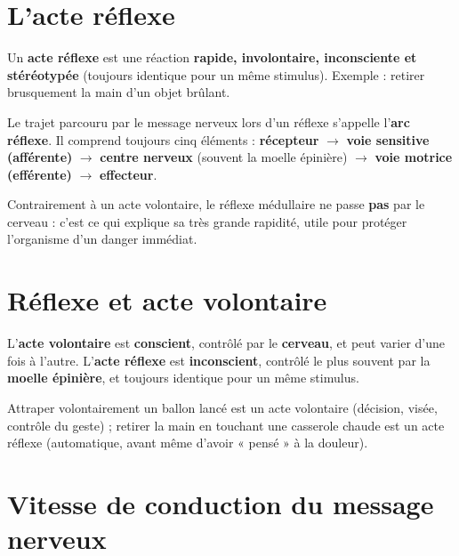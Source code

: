 \section{L'acte réflexe}

\begin{definition}
Un \textbf{acte réflexe} est une réaction \textbf{rapide, involontaire, inconsciente et
stéréotypée} (toujours identique pour un même stimulus). Exemple : retirer brusquement la
main d'un objet brûlant.
\end{definition}

\begin{propriete}
Le trajet parcouru par le message nerveux lors d'un réflexe s'appelle l'\textbf{arc
réflexe}. Il comprend toujours cinq éléments : \textbf{récepteur} $\to$ \textbf{voie
sensitive (afférente)} $\to$ \textbf{centre nerveux} (souvent la moelle épinière) $\to$
\textbf{voie motrice (efférente)} $\to$ \textbf{effecteur}.
\end{propriete}

\begin{remarque}
Contrairement à un acte volontaire, le réflexe médullaire ne passe \textbf{pas} par le
cerveau : c'est ce qui explique sa très grande rapidité, utile pour protéger l'organisme
d'un danger immédiat.
\end{remarque}

\section{Réflexe et acte volontaire}

\begin{propriete}[Comparaison]
L'\textbf{acte volontaire} est \textbf{conscient}, contrôlé par le \textbf{cerveau}, et
peut varier d'une fois à l'autre. L'\textbf{acte réflexe} est \textbf{inconscient},
contrôlé le plus souvent par la \textbf{moelle épinière}, et toujours identique pour un
même stimulus.
\end{propriete}

\begin{exemple}
Attraper volontairement un ballon lancé est un acte volontaire (décision, visée, contrôle
du geste) ; retirer la main en touchant une casserole chaude est un acte réflexe
(automatique, avant même d'avoir « pensé » à la douleur).
\end{exemple}

\section{Vitesse de conduction du message nerveux}

